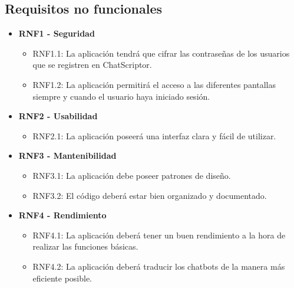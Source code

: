 \subsection{Requisitos no funcionales}

\begin{itemize}
    \item \textbf{RNF1 - Seguridad}
    \begin{itemize}
        \item RNF1.1: La aplicación tendrá que cifrar las contraseñas de los usuarios que se registren en ChatScriptor.
        \item RNF1.2: La aplicación permitirá el acceso a las diferentes pantallas siempre y cuando el usuario haya iniciado sesión.
    \end{itemize}
    
    \item \textbf{RNF2 - Usabilidad}
    \begin{itemize}
        \item RNF2.1: La aplicación poseerá una interfaz clara y fácil de utilizar.
    \end{itemize}

    \item \textbf{RNF3 - Mantenibilidad}
    \begin{itemize}
        \item RNF3.1: La aplicación debe poseer patrones de diseño.
        \item RNF3.2: El código deberá estar bien organizado y documentado.
    \end{itemize}
    
    \item \textbf{RNF4 - Rendimiento}
    \begin{itemize}
        \item RNF4.1: La aplicación deberá tener un buen rendimiento a la hora de realizar las funciones básicas.
        \item RNF4.2: La aplicación deberá traducir los chatbots de la manera más eficiente posible.
    \end{itemize}
\end{itemize}


